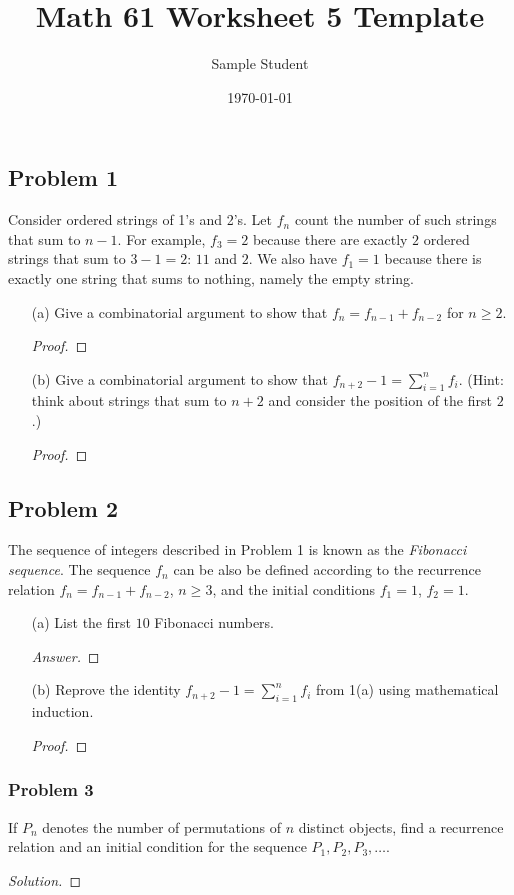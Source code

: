 \documentclass{article}
\title{Math 61 Worksheet 5 Template} %
\author{Sample Student} %
\date{\today}
\begin{document}
\maketitle

\subsection*{Problem 1}
Consider ordered strings of 1's and 2's. Let $f_n$ count the number of such strings that sum to $n-1$. For example, $f_3=2$ because there are exactly $2$ ordered strings that sum to $3-1=2$: $11$ and $2$. We also have $f_1=1$ because there is exactly one string that sums to nothing, namely the empty string.
\begin{enumerate}
\item[(a)] Give a combinatorial argument to show that $f_n=f_{n-1}+f_{n-2}$ for $n\geq 2$.
\begin{proof}

\end{proof}
\item[(b)] Give a combinatorial argument to show that $f_{n+2}-1=\sum_{i=1}^{n} f_i$. (Hint: think about strings that sum to $n+2$ and consider the position of the first $2$.)
\begin{proof}

\end{proof}
\end{enumerate}

\subsection*{Problem 2}
The sequence of integers described in Problem 1 is known as the \emph{Fibonacci sequence}. The sequence $f_n$ can be also be defined according to the  recurrence relation $f_n=f_{n-1}+f_{n-2}$,  $n \geq 3$, and the initial conditions $f_1=1$, $f_2=1$.
\begin{enumerate}
    \item[(a)] List the first $10$ Fibonacci numbers.
    \begin{proof}[Answer]
    
    \end{proof}
    \item[(b)] Reprove the identity $f_{n+2}-1=\sum_{i=1}^{n} f_i$ from 1(a) using mathematical induction.
    \begin{proof}
    
    \end{proof}
\end{enumerate}
\subsubsection*{Problem 3}
If $P_n$ denotes the number of permutations of $n$ distinct objects, find a recurrence relation and an initial condition for the sequence $P_1, P_2, P_3, \dots$. 
\begin{proof}[Solution]

\end{proof}
\end{document}

